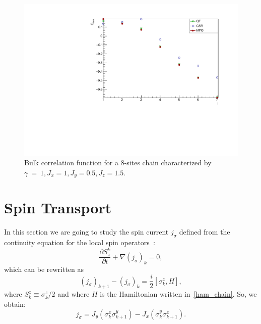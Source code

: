 \begin{figure}[H]
    \centering
    \includegraphics[scale=0.7]{Figures/8sites_comparison/CorrFuncBulk_8sJ10515.pdf}
    \caption{Bulk correlation function for a 8-sites chain characterized by $\gamma~=~1, J_x=1, J_y=0.5, J_z=1.5$.}
    \label{fig:my_label}
\end{figure}

\section{Spin Transport}
In this section we are going to study the spin current $j_\sigma$ defined from the continuity equation for the local spin operators~\cite{BenentiCasatiProsenRossini}:
\begin{equation}
    \frac{\partial S^k_z}{\partial t} + \nabla (j_\sigma)_k = 0,
\end{equation}
which can be rewritten as
\begin{equation}
    (j_\sigma)_{k+1}-(j_\sigma)_k = \frac{i}{2}[\sigma_k^z , H],
\end{equation}
where $S_k^z \equiv \sigma_k^z/2$ and where $H$ is the Hamiltonian written in~\ref{ham_chain}. So, we obtain:
\begin{equation}
    j_\sigma = J_y (\sigma_k^x \sigma_{k+1}^y) - J_x (\sigma_k^y \sigma_{k+1}^x).
\end{equation}


